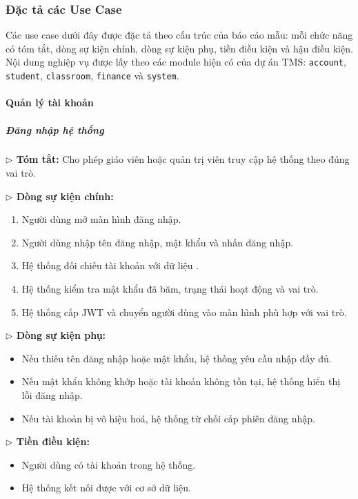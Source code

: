 \documentclass[12pt,a4paper]{article}
\newcommand{\code}[1]{{\ttfamily\seqsplit{#1}}}
\begin{document}
\subsubsection{Đặc tả các Use Case}

Các use case dưới đây được đặc tả theo cấu trúc của báo cáo mẫu: mỗi chức năng
có tóm tắt, dòng sự kiện chính, dòng sự kiện phụ, tiền điều kiện và hậu điều
kiện. Nội dung nghiệp vụ được lấy theo các module hiện có của dự án TMS:
\texttt{account}, \texttt{student}, \texttt{classroom}, \texttt{finance} và
\texttt{system}.

\paragraph{Quản lý tài khoản}

\subparagraph{Đăng nhập hệ thống}
\textbf{$\triangleright$ Tóm tắt:} Cho phép giáo viên hoặc quản trị viên truy cập hệ thống theo đúng vai trò.

\textbf{$\triangleright$ Dòng sự kiện chính:}
\begin{enumerate}[leftmargin=*]
\item Người dùng mở màn hình đăng nhập.
\item Người dùng nhập tên đăng nhập, mật khẩu và nhấn đăng nhập.
\item Hệ thống đối chiếu tài khoản với dữ liệu \code{Teacher}.
\item Hệ thống kiểm tra mật khẩu đã băm, trạng thái hoạt động và vai trò.
\item Hệ thống cấp JWT và chuyển người dùng vào màn hình phù hợp với vai trò.
\end{enumerate}

\textbf{$\triangleright$ Dòng sự kiện phụ:}
\begin{itemize}[leftmargin=*]
\item Nếu thiếu tên đăng nhập hoặc mật khẩu, hệ thống yêu cầu nhập đầy đủ.
\item Nếu mật khẩu không khớp hoặc tài khoản không tồn tại, hệ thống hiển thị lỗi đăng nhập.
\item Nếu tài khoản bị vô hiệu hoá, hệ thống từ chối cấp phiên đăng nhập.
\end{itemize}

\textbf{$\triangleright$ Tiền điều kiện:}
\begin{itemize}[leftmargin=*]
\item Người dùng có tài khoản trong hệ thống.
\item Hệ thống kết nối được với cơ sở dữ liệu.
\end{itemize}
\end{document}
